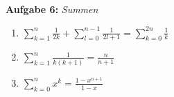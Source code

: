 \textbf{Aufgabe 6: } \emph{Summen}
\begin{enumerate}[label=(\alph*), labelindent=1em,labelsep=0.5cm]
    \item $\sum_{k=1}^n \frac{1}{2k}+ \sum_{l=0}^{n-1} \frac{1}{2l+1} =\sum_{k=0}^{2n} \frac{1}{k}$
    \item $\sum_{k=1}^n \frac{1}{k(k+1)} = \frac{n}{n+1}$
    \item $\sum_{k=0}^n x^k = \frac{1 - x^{n+1}}{1-x}$ 
\end{enumerate}


